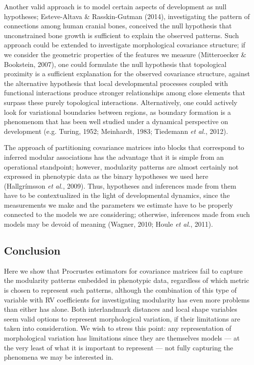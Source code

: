 \documentclass[12pt,twoside]{report}
\begin{document}
Another valid approach is to model certain aspects of development as
null hypotheses; Esteve-Altava \& Rasskin-Gutman (2014), investigating
the pattern of connections among human cranial bones, conceived the null
hypothesis that unconstrained bone growth is sufficient to explain the
observed patterns. Such approach could be extended to investigate
morphological covariance structure; if we consider the geometric
properties of the features we measure (Mitteroecker \& Bookstein, 2007),
one could formulate the null hypothesis that topological proximity is a
sufficient explanation for the observed covariance structure, against
the alternative hypothesis that local developmental processes coupled
with functional interactions produce stronger relationships among close
elements that surpass these purely topological interactions.
Alternatively, one could actively look for variational boundaries
between regions, as boundary formation is a phenomenom that has been
well studied under a dynamical perspective on development (e.g. Turing,
1952; Meinhardt, 1983; Tiedemann \emph{et al.}, 2012).

The approach of partitioning covariance matrices into blocks that
correspond to inferred modular associations has the advantage that it is
simple from an operational standpoint; however, modularity patterns are
almost certainly not expressed in phenotypic data as the binary
hypotheses we used here (Hallgrímsson \emph{et al.}, 2009). Thus,
hypotheses and inferences made from them have to be contextualized in
the light of developmental dynamics, since the measurements we make and
the parameters we estimate have to be properly connected to the models
we are considering; otherwise, inferences made from such models may be
devoid of meaning (Wagner, 2010; Houle \emph{et al.}, 2011).

\subsection{Conclusion}\label{conclusion}

Here we show that Procrustes estimators for covariance matrices fail to
capture the modularity patterns embedded in phenotypic data, regardless
of which metric is chosen to represent such patterns, although the
combination of this type of variable with RV coefficients for
investigating modularity has even more problems than either has alone.
Both interlandmark distances and local shape variables seem valid
options to represent morphological variation, if their limitations are
taken into consideration. We wish to stress this point: any
representation of morphological variation has limitations since they are
themselves models --- at the very least of what it is important to
represent --- not fully capturing the phenomena we may be interested in.
\end{document}
